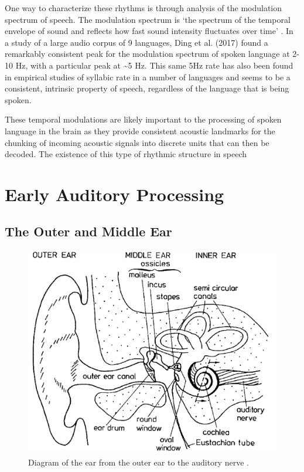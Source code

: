 \documentclass[titlepage]{article}
\begin{document}
    One way to characterize these rhythms is through analysis of the modulation spectrum of
    speech. The modulation spectrum is `the spectrum of the temporal envelope of sound and
    reflects how fast sound intensity fluctuates over time' \cite{Ding2017}. In a study of
    a large audio corpus of 9 languages, Ding et al. (2017) \cite{Ding2017} found a remarkably
    consistent peak for the modulation spectrum of spoken language at 2-10 Hz, with a particular
    peak at \textasciitilde 5 Hz. This same 5Hz rate has also been found in empirical studies of syllabic
    rate in a number of languages \cite{Pellegrino2011} and seems to be a consistent, intrinsic
    property of speech, regardless of the language that is being spoken.

    These temporal modulations are likely important to the processing of spoken language in the
    brain as they provide consistent acoustic landmarks for the chunking of incoming acoustic
    signals into discrete units that can then be decoded. The existence of this type of rhythmic
    structure in speech

\section{Early Auditory Processing} \label{early}

  \subsection{The Outer and Middle Ear}

    \begin{figure}
      \centering
      \includegraphics[scale=0.32]{earDiagram}
      \caption{Diagram of the ear from the outer ear to the auditory nerve \cite{Fastl2007}.}
      \label{earDiagram}
    \end{figure}
\end{document}
